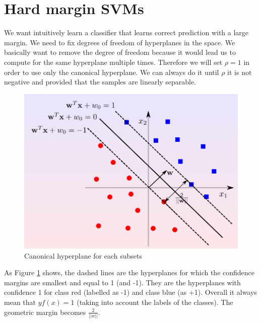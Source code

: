 \section{Hard margin SVMs}
We want intuitively learn a classifier that learns correct prediction with a
large margin. We need to fix degrees of freedom of hyperplanes in the space.
We basically want to remove the degree of freedom because it would lead us to compute
for the same hyperplane multiple times. Therefore we will set $\rho = 1$ in
order to use only the canonical hyperplane. We can always do it until $\rho$ it is
not negative and provided that the samples are linearly separable.
\begin{figure}[H]
	\centering
	\includegraphics[scale=0.4]{
		images/13_SupportVectorMachines_canonicalHyperplane.png
	}
	\caption{Canonical hyperplane for each subsets}
	\label{fig:canonical_hyperplanes}
\end{figure}
As Figure \ref{fig:canonical_hyperplanes} shows, the dashed lines are the hyperplanes
for which the confidence margins are smallest and equal to 1 (and -1). They are the
hyperplanes with confidence 1 for class red (labelled as -1) and class blue (as +1).
Overall it always mean that $yf(x) = 1$ (taking into account the labels of the classes).
The geometric margin becomes $\frac{2}{||w||}$.

